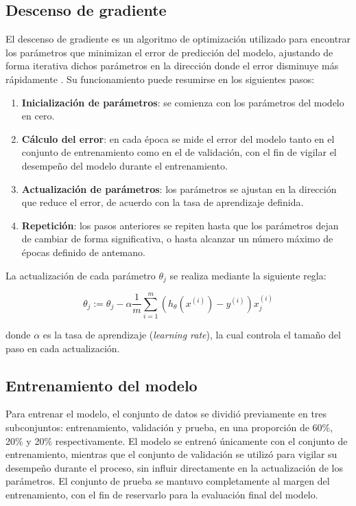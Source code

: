 \documentclass[10pt,journal,compsoc]{IEEEtran}
\begin{document}
\subsection{Descenso de gradiente}
El descenso de gradiente es un algoritmo de optimización utilizado para encontrar los parámetros que minimizan el error de predicción del modelo, ajustando de forma iterativa dichos parámetros en la dirección donde el error disminuye más rápidamente \cite{geeksforgeeks_gd}. Su funcionamiento puede resumirse en los siguientes pasos:

\begin{enumerate}
\item \textbf{Inicialización de parámetros}: se comienza con los parámetros del modelo en cero.
\item \textbf{Cálculo del error}: en cada época se mide el error del modelo tanto en el conjunto de entrenamiento como en el de validación, con el fin de vigilar el desempeño del modelo durante el entrenamiento.
\item \textbf{Actualización de parámetros}: los parámetros se ajustan en la dirección que reduce el error, de acuerdo con la tasa de aprendizaje definida.
\item \textbf{Repetición}: los pasos anteriores se repiten hasta que los parámetros dejan de cambiar de forma significativa, o hasta alcanzar un número máximo de épocas definido de antemano.
\end{enumerate}

La actualización de cada parámetro $\theta_j$ se realiza mediante la siguiente regla:

\begin{equation}
\theta_j := \theta_j - \alpha \frac{1}{m} \sum_{i=1}^{m} \left( h_\theta(x^{(i)}) - y^{(i)} \right) x_j^{(i)}
\label{eq:gradient_descent}
\end{equation}

donde $\alpha$ es la tasa de aprendizaje (\textit{learning rate}), la cual controla el tamaño del paso en cada actualización.

\subsection{Entrenamiento del modelo}
Para entrenar el modelo, el conjunto de datos se dividió previamente en tres subconjuntos: entrenamiento, validación y prueba, en una proporción de 60\%, 20\% y 20\% respectivamente. El modelo se entrenó únicamente con el conjunto de entrenamiento, mientras que el conjunto de validación se utilizó para vigilar su desempeño durante el proceso, sin influir directamente en la actualización de los parámetros. El conjunto de prueba se mantuvo completamente al margen del entrenamiento, con el fin de reservarlo para la evaluación final del modelo.
\end{document}
